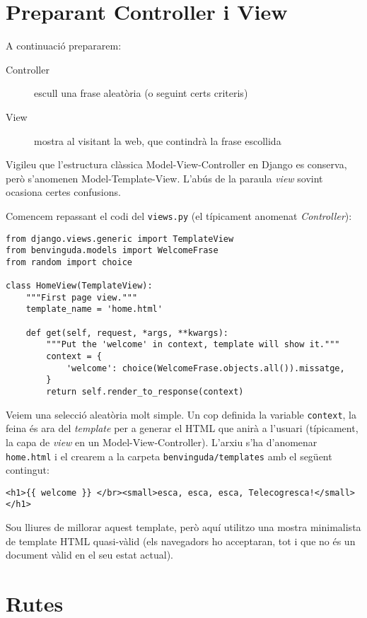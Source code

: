 \documentclass[12pt,a4paper]{article}
\begin{document}
\section{Preparant Controller i View}

A continuació prepararem:
\begin{description}
\item[Controller] escull una frase aleatòria (o seguint certs criteris)
\item[View] mostra al visitant la web, que contindrà la frase escollida
\end{description}

Vigileu que l'estructura clàssica Model-View-Controller en Django es conserva, però s'anomenen Model-Template-View. L'abús de la paraula \emph{view} sovint ocasiona certes confusions.

Comencem repassant el codi del \verb+views.py+ (el típicament anomenat \emph{Controller}):

\begin{lstlisting}
from django.views.generic import TemplateView
from benvinguda.models import WelcomeFrase
from random import choice

class HomeView(TemplateView):
    """First page view."""
    template_name = 'home.html'

    def get(self, request, *args, **kwargs):
        """Put the 'welcome' in context, template will show it."""
        context = {
            'welcome': choice(WelcomeFrase.objects.all()).missatge,
        }
        return self.render_to_response(context)
\end{lstlisting}

Veiem una selecció aleatòria molt simple. Un cop definida la variable \verb+context+, la feina és ara del \emph{template} per a generar el HTML que anirà a l'usuari (típicament, la capa de \emph{view} en un Model-View-Controller). L'arxiu s'ha d'anomenar \verb+home.html+ i el crearem a la carpeta \verb+benvinguda/templates+ amb el següent contingut:

\begin{verbatim}
<h1>{{ welcome }} </br><small>esca, esca, esca, Telecogresca!</small></h1>
\end{verbatim}

Sou lliures de millorar aquest template, però aquí utilitzo una mostra minimalista de template HTML quasi-vàlid (els navegadors ho acceptaran, tot i que no és un document vàlid en el seu estat actual).

\section{Rutes}
\end{document}
